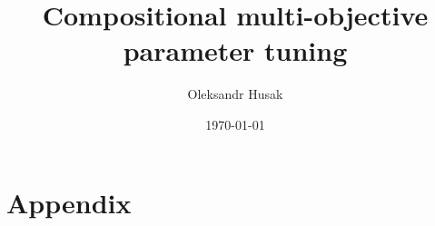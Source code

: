 \documentclass[ms,english]{stthesis}
\title{Compositional multi-objective parameter tuning}
\author{Oleksandr Husak}
\date{\today}
\begin{document}
    \maketitle %
  
    \tableofcontents

    
    
    
    
    
    
    
    
    
    
    
    \backmatter
    
    \appendix
    
    \chapter{Appendix}
\end{document}
